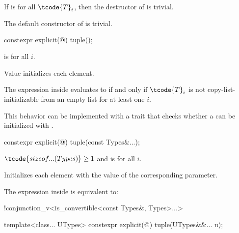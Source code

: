 \pnum
If  is  for all $\tcode{T}_i$,
then the destructor of  is trivial.

\pnum
The default constructor of  is trivial.

%
\begin{itemdecl}
constexpr explicit(@\seebelow@) tuple();
\end{itemdecl}

\begin{itemdescr}
\pnum
\constraints
{} is  for all $i$.

\pnum
\effects
Value-initializes each element.

\pnum
\remarks
The expression inside  evaluates to 
if and only if $\tcode{T}_i$ is not
copy-list-initializable from an empty list
for at least one $i$.
\begin{note}
This behavior can be implemented with a trait that checks whether
a  can be initialized with \tcode{\{\}}.
\end{note}
\end{itemdescr}

%
\begin{itemdecl}
constexpr explicit(@\seebelow@) tuple(const Types&...);
\end{itemdecl}

\begin{itemdescr}
\pnum
\constraints
$\tcode{sizeof...(Types)} \geq 1$ and
 is  for all $i$.

\pnum
\effects
Initializes each element with the value of the
corresponding parameter.

\pnum
\remarks
The expression inside  is equivalent to:
\begin{codeblock}
!conjunction_v<is_convertible<const Types&, Types>...>
\end{codeblock}
\end{itemdescr}

%
\begin{itemdecl}
template<class... UTypes> constexpr explicit(@\seebelow@) tuple(UTypes&&... u);
\end{itemdecl}

